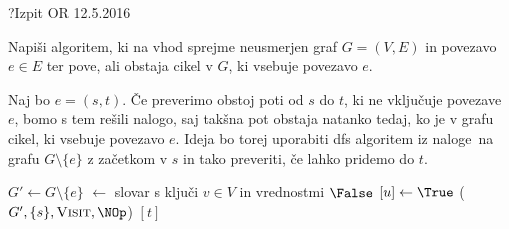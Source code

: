 \begin{naloga}{?}{Izpit OR 12.5.2016}
\begin{vprasanje}
Napiši algoritem,
ki na vhod sprejme neusmerjen graf $G = (V, E)$ in povezavo $e \in E$
ter pove, ali obstaja cikel v $G$, ki vsebuje povezavo $e$.
\end{vprasanje}

\begin{odgovor}
Naj bo $e = (s, t)$. 
Če preverimo obstoj poti od $s$ do $t$, ki ne vključuje povezave $e$, 
bomo s tem rešili nalogo, saj takšna pot obstaja natanko tedaj, 
ko je v grafu cikel, ki vsebuje povezavo $e$.
Ideja bo torej uporabiti {\sc dfs} algoritem iz naloge~\nal[dfs]
na grafu $G \setminus \{e\}$ z začetkom v $s$ in tako preveriti,
če lahko pridemo do $t$.
\begin{small}
\begin{algorithmic}
	\State $G' \gets G \setminus \{e\}$
	 $\gets$ slovar s ključi $v \in V$ in vrednostmi $\False$
		$[u] \gets \True$
	\EndFunction
	($G', \{s\}, \text{\sc Visit}, \NOp$)
	\State {}$[t]$
\EndFunction
\end{algorithmic}
\end{small}
\end{odgovor}
\end{naloga}
